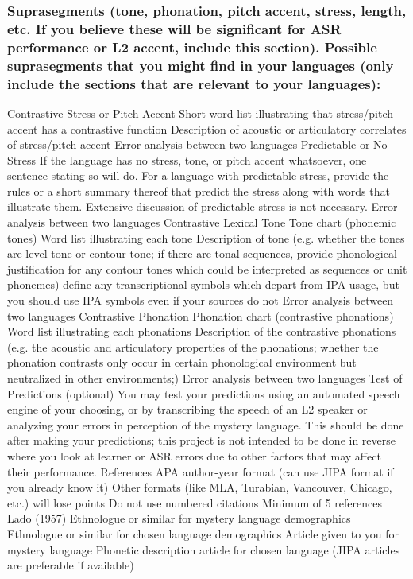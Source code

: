 \documentclass[12pt]{article}
\begin{document}
\subsubsection*{Suprasegments (tone, phonation, pitch accent, stress, length, etc. If you believe these will be significant for ASR performance or L2 accent, include this section). Possible suprasegments that you might find in your languages (only include the sections that are relevant to your languages):}
Contrastive Stress or Pitch Accent
Short word list illustrating that stress/pitch accent has a contrastive function
Description of acoustic or articulatory correlates of stress/pitch accent
Error analysis between two languages
Predictable or No Stress
If the language has no stress, tone, or pitch accent whatsoever, one sentence stating so will do.
For a language with predictable stress, provide the rules or a short summary thereof that predict the stress along with words that illustrate them. Extensive discussion of predictable stress is not necessary.
Error analysis between two languages
Contrastive Lexical Tone
Tone chart (phonemic tones)
Word list illustrating each tone
Description of tone (e.g. whether the tones are level tone or contour tone; if there are tonal sequences, provide phonological justification for any contour tones which could be interpreted as sequences or unit phonemes)
define any transcriptional symbols which depart from IPA usage, but you should use IPA symbols even if your sources do not
Error analysis between two languages
Contrastive Phonation
Phonation chart (contrastive phonations)
Word list illustrating each phonations
Description of the contrastive phonations (e.g. the acoustic and articulatory properties of the phonations; whether the phonation contrasts only occur in certain phonological environment but neutralized in other environments;)
Error analysis between two languages
Test of Predictions (optional)
You may test your predictions using an automated speech engine of your choosing, or by transcribing the speech of an L2 speaker or analyzing your errors in perception of the mystery language. This should be done after making your predictions; this project is not intended to be done in reverse where you look at learner or ASR errors due to other factors that may affect their performance.
References
APA author-year format (can use JIPA format if you already know it)
Other formats (like MLA, Turabian, Vancouver, Chicago, etc.) will lose points
Do not use numbered citations
Minimum of 5 references
Lado (1957)
Ethnologue or similar for mystery language demographics
Ethnologue or similar for chosen language demographics
Article given to you for mystery language
Phonetic description article for chosen language (JIPA articles are preferable if available)
\end{document}
